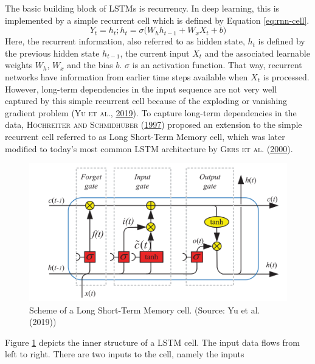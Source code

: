 \documentclass[a4paper,11pt]{article}
\begin{document}
The basic building block of LSTMs is recurrency. In deep learning, this is implemented
by a simple recurrent cell which is defined by Equation \eqref{eq:rnn-cell}.
\begin{equation}
Y_t = h_t; h_t = \sigma \Big( W_h h_{t-1} + W_xX_t + b \Big)
\label{eq:rnn-cell}
\end{equation}
Here, the recurrent information, also referred to as hidden state, \(h_t\) is defined
by the previous hidden state \(h_{t-1}\), the current input \(X_t\) and the associated
learnable weights \(W_{h}\), \(W_x\) and the bias \(b\). \(\sigma\) is an activation function.
That way, recurrent networks have information from earlier time steps available
when \(X_t\) is processed. However, long-term dependencies in the input sequence are
not very well captured by this simple recurrent cell because of the
exploding or vanishing gradient problem \textsc{(\textnormal{\textsc{Yu} \textsc{et al.}}, \textnormal{\protect\hyperlink{ref-yu2019}{2019}})}. To capture long-term dependencies
in the data, \textsc{\textnormal{Hochreiter} and \textnormal{Schmidhuber}} \textsc{(\textnormal{\protect\hyperlink{ref-hochreiter1997}{1997}})} proposed an extension to the
simple recurrent cell referred to as Long Short-Term Memory cell, which was
later modified to today's most common LSTM architecture by \textsc{\textnormal{Gers} \textnormal{et al.}} \textsc{(\textnormal{\protect\hyperlink{ref-gers2000}{2000}})}.
\begin{figure}[H]

{\centering \includegraphics[width=0.8\linewidth]{../assets/img/LSTM} 

}

\caption[Scheme of a Long Short-Term Memory cell.]{Scheme of a Long Short-Term Memory cell. (Source: Yu et al. (2019))}\label{fig:03-methods-lstm}
\end{figure}
Figure \ref{fig:03-methods-lstm} depicts the inner structure of a LSTM cell. The input
data flows from left to right. There are two inputs to the cell, namely the inputs
\end{document}
